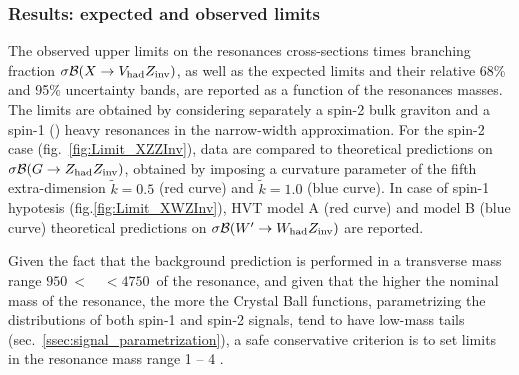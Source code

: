 \clearpage

\subsubsection{Results: expected and observed limits}


The observed upper limits on the resonances cross-sections times branching fraction $\sigma \mathcal{B} (X \rightarrow V_{\text{had}} Z_{\text{inv}})$, as well as the expected limits and their relative 68\% and 95\% uncertainty bands, are reported as a function of the resonances masses. The limits are obtained by considering separately a spin-2 bulk graviton and a spin-1 (\Wp) heavy resonances in the narrow-width approximation. For the spin-2 case (fig.~\ref{fig:Limit_XZZInv}), data are compared to theoretical predictions on $\sigma \mathcal{B} (G \rightarrow Z_{\text{had}} Z_{\text{inv}})$, obtained by imposing a curvature parameter of the fifth extra-dimension $\tilde{k} = 0.5$ (red curve) and $\tilde{k} = 1.0$ (blue curve). In case of spin-1 hypotesis (fig.\ref{fig:Limit_XWZInv}), HVT model A (red curve) and model B (blue curve) theoretical predictions on $\sigma \mathcal{B} (W' \rightarrow W_{\text{had}} Z_{\text{inv}})$ are reported.

\noindent Given the fact that the background prediction is performed in a transverse mass range $950~<$~\mtVZ~$<4750$~\GeV of the resonance, and given that the higher the nominal mass of the resonance, the more the Crystal Ball functions, parametrizing the \mtVZ distributions of both spin-1 and spin-2 signals, tend to have low-mass tails (sec.~\ref{ssec:signal_parametrization}), a safe conservative criterion is to set limits in the resonance mass range 1 \TeV -- 4 \TeV.

